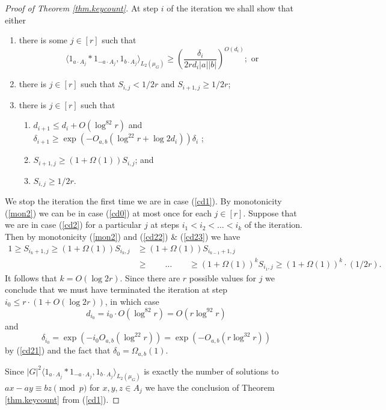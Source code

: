 \documentclass[12pt,reqno]{amsart}
\numberwithin{equation}{section}
\begin{document}
\begin{proof}[Proof of Theorem \ref{thm.keycount}]
At step $i$ of the iteration we shall show that either
\begin{enumerate}
\item\label{cd1} there is some $j \in [r]$ such that
\begin{equation*}
\langle 1_{a\cdot A_j} \ast 1_{-a\cdot A_j},1_{b \cdot A_j}\rangle_{L_2(\mu_G)} \geq \left(\frac{\delta_i}{2rd_i|a||b|}\right)^{O(d_i)};\text{ or }
\end{equation*}
\item \label{cd0} there is $j \in [r]$ such that $S_{i,j} < 1/2r$ and $S_{i+1,j} \geq 1/2r$;
\item\label{cd2} there is $j \in [r]$ such that
\begin{enumerate}
\item\label{cd21} $d_{i+1} \leq d_i + O(\log^82r)$ and $\delta_{i+1} \geq  \exp(-O_{a,b}(\log^22r+\log 2d_i)) \delta_i$ ;
\item\label{cd22} $S_{i+1,j} \geq (1+\Omega(1))S_{i,j}$; and
\item\label{cd23} $S_{i,j} \geq 1/2r$.
\end{enumerate}
\end{enumerate}
We stop the iteration the first time we are in case (\ref{cd1}). By monotonicity (\ref{mon2}) we can be in case (\ref{cd0}) at most once for each $j \in [r]$. Suppose that we are in case (\ref{cd2}) for a particular $j$ at steps $i_1 <i_2<\dots < i_k$ of the iteration. Then by monotonicity (\ref{mon2}) and (\ref{cd22}) \& (\ref{cd23}) we have
\begin{align*}
1 \geq S_{i_k+1,j} \geq (1+\Omega(1))S_{i_k,j} & \geq (1+\Omega(1))S_{i_{k-1}+1,j}\\ & \geq \qquad \dots \qquad  \geq (1+\Omega(1))^kS_{i_1,j} \geq (1+\Omega(1))^k\cdot (1/2r).
\end{align*}
It follows that $k=O(\log 2r)$. Since there are $r$ possible values for $j$ we conclude that we must have terminated the iteration at step $i_0\leq r\cdot (1+O(\log 2r))$, in which case
\begin{equation*}
d_{i_0} =i_0\cdot O(\log^82r) = O(r\log^92r)
\end{equation*}
and
\begin{equation*}
\delta_{i_0} = \exp(-i_0O_{a,b}(\log^22r))=\exp(-O_{a,b}(r\log^32r))
\end{equation*}
by (\ref{cd21}) and the fact that $\delta_0=\Omega_{a,b}(1)$.

Since $|G|^2\langle 1_{a\cdot A_j} \ast 1_{-a\cdot A_j},1_{b \cdot A_j}\rangle_{L_2(\mu_G)} $ is exactly the number of solutions to $ax-ay\equiv bz \pmod p$ for $x,y,z \in A_j$ we have the conclusion of Theorem \ref{thm.keycount} from (\ref{cd1}).


\end{proof}
\end{document}
